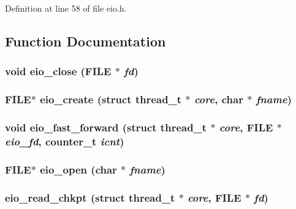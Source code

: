 Definition at line 58 of file eio.h.

\subsection{Function Documentation}
\subsubsection[{eio\_\-close}]{\setlength{\rightskip}{0pt plus 5cm}void eio\_\-close (FILE $\ast$ {\em fd})}\label{eio_8h_5a394eec83655053559e8be7983a3fca}


\subsubsection[{eio\_\-create}]{\setlength{\rightskip}{0pt plus 5cm}FILE$\ast$ eio\_\-create (struct {\bf thread\_\-t} $\ast$ {\em core}, \/  char $\ast$ {\em fname})}\label{eio_8h_d017d2ea71d2d9c6dfb54fbd1c0fe586}


\subsubsection[{eio\_\-fast\_\-forward}]{\setlength{\rightskip}{0pt plus 5cm}void eio\_\-fast\_\-forward (struct {\bf thread\_\-t} $\ast$ {\em core}, \/  FILE $\ast$ {\em eio\_\-fd}, \/  {\bf counter\_\-t} {\em icnt})}\label{eio_8h_068de1665cc69d2404bf5a433cbc88ca}


\subsubsection[{eio\_\-open}]{\setlength{\rightskip}{0pt plus 5cm}FILE$\ast$ eio\_\-open (char $\ast$ {\em fname})}\label{eio_8h_89207afd7f32a5e68bee6ce011b2edf0}


\subsubsection[{eio\_\-read\_\-chkpt}]{ eio\_\-read\_\-chkpt (struct {\bf thread\_\-t} $\ast$ {\em core}, \/  FILE $\ast$ {\em fd})}\label{eio_8h_b3d287b57c27288e7fae317a9658c846}


